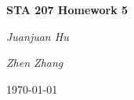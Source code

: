 \documentclass[12pt,a4paper]{report}
\begin{document}
\begin{titlepage}
	\centering
	{\huge\bfseries STA 207 Homework 5\par}
	\vspace{2cm}
	{\Large\itshape Juanjuan Hu\par}
	\vspace{1cm}
	{\Large\itshape Zhen Zhang\par}
	\vfill

	\vfill

	{\large \today\par}
\end{titlepage}
\end{document}
